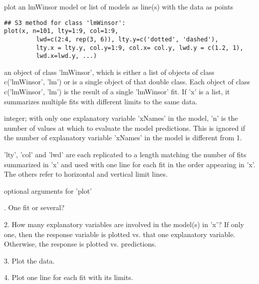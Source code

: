 \documentclass{article}
\begin{document}
\begin{Description}\relax
plot an lmWinsor model or list of models as line(s) with the data as
points
\end{Description}
\begin{Usage}
\begin{verbatim}
## S3 method for class 'lmWinsor':
plot(x, n=101, lty=1:9, col=1:9,
         lwd=c(2:4, rep(3, 6)), lty.y=c('dotted', 'dashed'),
         lty.x = lty.y, col.y=1:9, col.x= col.y, lwd.y = c(1.2, 1),
         lwd.x=lwd.y, ...)
\end{verbatim}
\end{Usage}
\begin{Arguments}
\begin{ldescription}
\item[\code{x}] an object of class 'lmWinsor', which is either a list of objects of
class c('lmWinsor', 'lm') or is a single object of that double
class.  Each object of class c('lmWinsor', 'lm') is the result of a
single 'lmWinsor' fit.  If 'x' is a list, it summarizes multiple
fits with different limits to the same data.  

\item[\code{n}] integer;  with only one explanatory variable 'xNames' in the model,
'n' is the number of values at which to evaluate the model
predictions.  This is ignored if the number of explanatory variable
'xNames' in the model is different from 1.  

\item[\code{lty, col, lwd, lty.y, lty.x, col.y, col.x, lwd.y, lwd.x}] 'lty', 'col' and 'lwd' are each replicated to a length matching the
number of fits summarized in 'x' and used with one line for each fit
in the order appearing in 'x'.  The others refer to horizontal and
vertical limit lines. 

\item[\code{...}] optional arguments for 'plot'  

\end{ldescription}
\end{Arguments}
\begin{Details}.  One fit or several?  

2.  How many explanatory variables are involved in the model(s) in
'x'?  If only one, then the response variable is plotted vs. that one
explanatory variable.  Otherwise, the response is plotted
vs. predictions. 

3.  Plot the data.

4.  Plot one line for each fit with its limits.
\end{Details}
\end{document}
